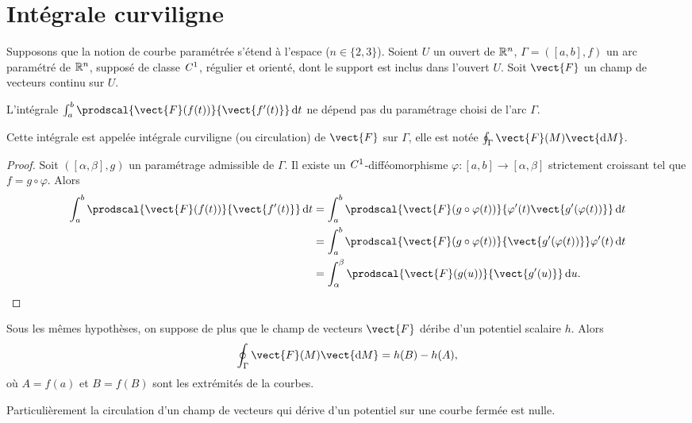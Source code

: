 \section{Intégrale curviligne}

Supposons que la notion de courbe paramétrée s'étend à l'espace ($n \in \{2, 3\}$). Soient $U$ un ouvert de $\mathbb{R}^n$, $\Gamma=([a,b], f)$ un arc paramétré de $\mathbb{R}^n$, supposé de classe $\mathit{C}^1$, régulier et orienté, dont le support est inclus dans l'ouvert $U$. Soit $\vect{F}$ un champ de vecteurs continu sur $U$.

\begin{prop}
  L'intégrale $\int_a^b \prodscal{\vect{F}(f(t))}{\vect{f'(t)}} \diff t$ ne dépend pas du paramétrage choisi de l'arc $\Gamma$.
\end{prop}
\begin{defdef}
  Cette intégrale est appelée intégrale curviligne (ou circulation) de $\vect{F}$ sur $\Gamma$, elle est notée $\oint_\Gamma \vect{F}(M)\vect{\diff M}$.
\end{defdef}
\begin{proof}
  Soit $([\alpha, \beta], g)$ un paramétrage admissible de $\Gamma$. Il existe un $\mathit{C}^1$-difféomorphisme $\varphi : [a, b] \rightarrow [\alpha, \beta]$ strictement croissant tel que $f=g \circ \varphi$.  Alors
  \begin{align}
    \int_a^b \prodscal{\vect{F}(f(t))}{\vect{f'(t)}} \diff t &= \int_a^b \prodscal{\vect{F}(g \circ \varphi(t))}{\varphi'(t)\vect{g'(\varphi(t))}} \diff t \\
    &=\int_a^b \prodscal{\vect{F}(g \circ \varphi(t))}{\vect{g'(\varphi(t))}} \varphi'(t)\diff t \\
    &=\int_\alpha^\beta \prodscal{\vect{F}(g(u))}{\vect{g'(u)}} \diff u.
  \end{align}
\end{proof}

\begin{prop}
  Sous les mêmes hypothèses, on suppose de plus que le champ de vecteurs $\vect{F}$ déribe d'un potentiel scalaire $h$. Alors
  \begin{equation}
    \oint_\Gamma \vect{F}(M)\vect{\diff M} = h(B)-h(A),
  \end{equation}
  où $A=f(a)$ et $B=f(B)$ sont les extrémités de la courbes.
\end{prop}

Particulièrement la circulation d'un champ de vecteurs qui dérive d'un potentiel sur une courbe fermée est nulle.

